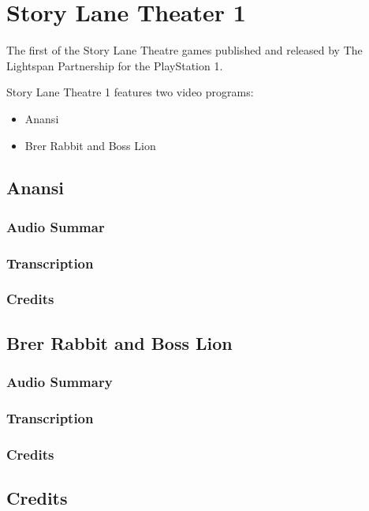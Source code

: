 \chapter{Story Lane Theater 1}


The first of the Story Lane Theatre games published and released by The Lightspan Partnership for the PlayStation 1.

Story Lane Theatre 1 features two video programs:

\begin{itemize}
    \item Anansi
    \item Brer Rabbit and Boss Lion
\end{itemize}

\clearpage
\newpage

\section{Anansi}

\subsection{Audio Summar}

\subsection{Transcription}

\subsection{Credits}

\section{Brer Rabbit and Boss Lion}

\subsection{Audio Summary}

\subsection{Transcription}

\subsection{Credits}

\section{Credits}